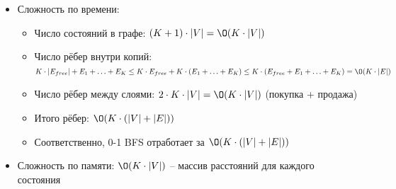 \begin{enumerate}
\begin{itemize}
\begin{lstlisting}[language=Python]
    deq = deque()
    deq.append((s, 0))
    
    while deq:
        vert, layer = deq.popleft()
        curr_dist = dist[vert][layer]

        # Relax free edges (weight 0)
        for neighbor in free_edges[vert]:
            if curr_dist < dist[neighbor][layer]:
                dist[neighbor][layer] = curr_dist
                deq.appendleft((neighbor, layer))
        
        if layer == 0:
            # Buy pass: (v, 0) -> (v, k) with weight A - B
            for k in range(1, K + 1):
                new_dist = curr_dist + A - B
                if new_dist < dist[vert][k]:
                    dist[vert][k] = new_dist
                    deq.append((vert, k))
        else:
            # Paid edges inside the same layer (weight 0)
            for neighbor, edge_type in paid_edges[vert]:
                if edge_type == layer and curr_dist < dist[neighbor][layer]:
                    dist[neighbor][layer] = curr_dist
                    deq.appendleft((neighbor, layer))
            
            # Sell pass: (v, k) -> (v, 0) with weight 0
            if curr_dist < dist[vert][0]:
                dist[vert][0] = curr_dist
                deq.appendleft((vert, 0))
    
    return min(dist[t])
      \end{lstlisting}

      \item Сложность по времени:
      \begin{itemize}
        \item Число состояний в графе: $(K + 1) \cdot |V| = \O(K \cdot |V|)$
        \item Число рёбер внутри копий: 
        $K \cdot |E_{free}| + E_1 + \ldots + E_K \leq K \cdot E_{free} + K \cdot (E_1 + \ldots + E_K) \leq K \cdot (E_{free} + E_1 + \ldots + E_K) = \O(K \cdot |E|)$
        \item Число рёбер между слоями: $2 \cdot K \cdot |V| = \O(K \cdot |V|)$ (покупка + продажа)
        \item Итого рёбер: $\O(K \cdot (|V| + |E|))$
        \item Соответственно, 0-1 BFS отработает за $\O(K \cdot (|V| + |E|))$
      \end{itemize}

      \item Сложность по памяти: $\O(K \cdot |V|)$ -- массив расстояний для каждого состояния
      

\end{itemize}
\end{enumerate}
